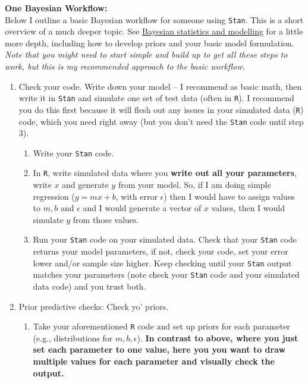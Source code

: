 \documentclass[11pt,letter]{article}
\begin{document}

\renewcommand{\refname}{\CHead{}}

{\bf One Bayesian Workflow:} \\

Below I outline a basic Bayesian workflow for someone using \verb|Stan|. This is a short overview of a much deeper topic. See \href{https://www.nature.com/articles/s43586-020-00001-2}{Bayesian statistics and modelling} for a little more depth, including how to develop priors and your basic model formulation.\\

\emph{Note that you might need to start simple and build up to get all these steps to work, but this is my recommended approach to the basic workflow.}

\begin{enumerate}
\item Check your code. Write down your model -- I recommend as basic math, then write it in \verb|Stan| and simulate one set of test data (often in \verb|R|). I recommend you do this first because it will flesh out any issues in your simulated data (\verb|R|) code, which you need right away (but you don't need the \verb|Stan| code until step 3).
\begin{enumerate}
\item Write your \verb|Stan| code.
\item In \verb|R|, write simulated data where you {\bf write out all your parameters}, write $x$ and generate $y$ from your model. So, if I am doing simple regression ($y=mx+b$, with error $\epsilon$) then I would have to assign values to $m, b$ and $\epsilon$ and I would generate a vector of $x$ values, then I would simulate $y$ from those values.
\item Run your \verb|Stan| code on your simulated data. Check that your \verb|Stan| code returns your model parameters, if not, check your code, set your error lower and/or sample size higher. Keep checking until your \verb|Stan| output matches your parameters (note check your \verb|Stan| code and your simulated data code) and you trust both.
\end{enumerate}
\item Prior predictive checks: Check yo' priors.
\begin{enumerate}
\item Take your aforementioned \verb|R| code and set up priors for each parameter (e.g., distributions for $m, b, \epsilon$). {\bf In contrast to above, where you just set each parameter to one value, here you you want to draw multiple values for each parameter and visually check the output.} 

\end{enumerate}
\end{enumerate}
\end{document}
